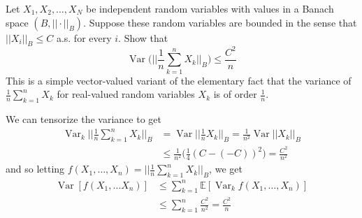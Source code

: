 \documentclass{article}
\DeclareMathOperator{\Var}{Var}
\begin{document}
  \begin{exercise}
  Let $X_1, X_2, \ldots, X_N$ be independent random variables with values in a Banach space $(B, ||\cdot ||_B)$. Suppose these random variables are bounded in the sense that $||X_i||_B \leq C$ a.s. for every $i$. Show that 
  \[\Var\bigg( \bigg| \bigg| \frac{1}{n} \sum_{k=1}^n X_k \bigg| \bigg|_B \bigg) \leq \frac{C^2}{n}\]
  This is a simple vector-valued variant of the elementary fact that the variance of $\frac{1}{n} \sum_{k=1}^n X_k$ for real-valued random variables $X_k$ is of order $\frac{1}{n}$. 
  \end{exercise}
  \begin{solution}
  We can tensorize the variance to get 
  \begin{align*}
      \Var_k \bigg| \bigg| \frac{1}{n} \sum_{k=1}^n X_k \bigg| \bigg|_B & = \Var \bigg| \bigg| \frac{1}{n} X_k \bigg| \bigg|_B = \frac{1}{n^2} \Var ||X_k||_B \\
      & \leq \frac{1}{n^2} \bigg( \frac{1}{4} (C - (-C))^2 \bigg) = \frac{C^2}{n^2} 
  \end{align*}
  and so letting $f(X_1, \ldots, X_n) = \big| \big| \frac{1}{n} \sum_{k=1}^n X_k \big| \big|_B$, we get 
  \begin{align*}
      \Var [f(X_1, \ldots X_n)] & \leq \sum_{k=1}^n \mathbb{E}[ \Var_k f (X_1, \ldots, X_n)] \\
      & \leq \sum_{k=1}^n \frac{C^2}{n^2} = \frac{C^2}{n} 
  \end{align*}
  \end{solution}
\end{document}
